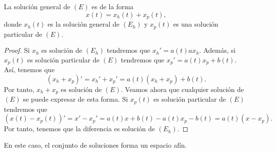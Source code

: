 \begin{colorary}
La solución general de $\displaystyle \left(E\right) $ es de la forma 
\[x\left(t\right)=x_{h}\left(t\right)+x_{p}\left(t\right) ,\]
donde $\displaystyle x_{h}\left(t\right) $ es la solución general de $\displaystyle \left(E_{h}\right) $ y $\displaystyle x_{p}\left(t\right) $ es una solución particular de $\displaystyle \left(E\right) $.
\end{colorary}
\begin{proof}
Si $\displaystyle x_{h} $ es solución de $\displaystyle \left(E_{h}\right) $ tendremos que $\displaystyle x_{h}' = a\left(t\right)ax_{h} $. Además, si $\displaystyle x_{p}\left(t\right) $ es solución particular de $\displaystyle \left(E\right) $ tendremos que $\displaystyle x_{p}' = a\left(t\right)x_{p} + b\left(t\right) $. Así, tenemos que
\[\left(x_{h} + x_{p}\right)' = x_{h}' + x_{p} ' = a\left(t\right)\left(x_{h} + x_{p}\right) + b\left(t\right).\]
Por tanto, $\displaystyle x_{h}+x_{p} $ es solución de $\displaystyle \left(E\right) $. Veamos ahora que cualquier solución de $\displaystyle \left(E\right) $ se puede expresar de esta forma. Si $\displaystyle x_{p}\left(t\right) $ es solución particular de $\displaystyle \left(E\right) $ tendremos que 
\[\left(x\left(t\right) - x_{p}\left(t\right)\right)' = x' - x_{p}' = a\left(t\right)x + b\left(t\right)-a\left(t\right)x_{p} -b\left(t\right) = a\left(t\right)\left(x-x_{p}\right) .\]
Por tanto, tenemos que la diferencia es solución de $\displaystyle \left(E_{h}\right) $. 
\end{proof}

\begin{observation}
En este caso, el conjunto de soluciones forma un espacio afín.
\end{observation}


